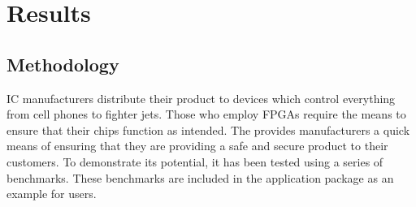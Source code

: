 \label{chapter:eval}
\section{Results} \label{sec:Results}
\subsection{Methodology}
\acrlong{IC} manufacturers distribute their product to devices which control everything from cell phones to fighter jets. 
Those who employ \acrlong{FPGAs} require the means to ensure that their chips function as intended. 
The \NameNoPeriod provides manufacturers a quick means of ensuring that they are providing a safe and secure product to their customers.
To demonstrate its potential, it has been tested using a series of benchmarks.
These benchmarks are included in the \NameNoPeriod application package as an example for users.
